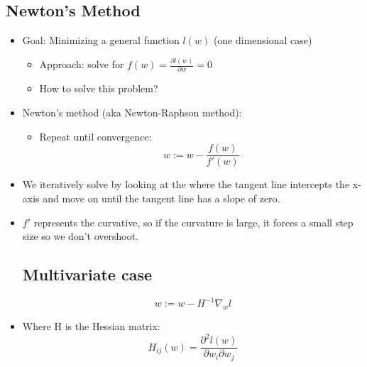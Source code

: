 \subsection{Newton's Method}
\begin{itemize}
	\item Goal: Minimizing a general function $l(w)$ (one dimensional case)
	\begin{itemize}
		\item Approach: solve for $f(w)=\frac{\partial l(w)}{\partial w}=0$
		\item How to solve this problem?
	\end{itemize}
	\item Newton's method (aka Newton-Raphson method):
	\begin{itemize}
		\item Repeat until convergence:
		$$w:= w- \frac{f(w)}{f'(w)}$$
	\end{itemize}
	\item We iteratively solve by looking at the where the tangent line intercepts the x-axis and move on until the tangent line has a slope of zero.
	\item $f'$ represents the curvative, so if the curvature is large, it forces a small step size so we don't overshoot.
	\subsection{Multivariate case}
	$$w:=w-H^{-1}\nabla_w l$$
	\item Where H is the Hessian matrix:
		$$H_{ij}(w)=\frac{\partial^2 l(w)}{\partial w_i \partial w_j}$$
\end{itemize}

